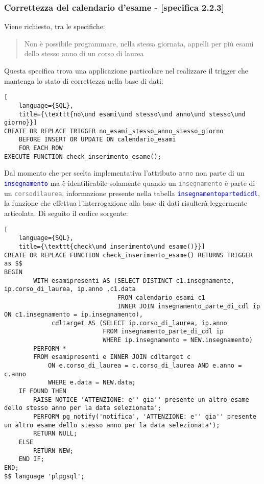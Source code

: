 \documentclass{article}
\newcommand{\tabb}[1]{\texttt{\textcolor{blue}{#1}}}
\newcommand{\attr}[1]{\texttt{\textcolor{gray}{#1}}}
\newcommand{\und}[0]{\textunderscore}
\begin{document}
\subsubsection{Correttezza del calendario d'esame - [specifica 2.2.3]}
Viene richiesto, tra le specifiche:
\begin{quote}
    Non è possibile programmare, nella stessa giornata, appelli per più esami dello stesso anno di un corso di laurea
\end{quote}
Questa specifica trova una applicazione particolare nel realizzare il trigger che mantenga lo stato di correttezza nella base di dati:
\begin{lstlisting}[
    language={SQL},
    title={\texttt{no\und esami\und stesso\und anno\und stesso\und giorno}}]
CREATE OR REPLACE TRIGGER no_esami_stesso_anno_stesso_giorno
    BEFORE INSERT OR UPDATE ON calendario_esami
    FOR EACH ROW
EXECUTE FUNCTION check_inserimento_esame();

\end{lstlisting}
Dal momento che per scelta implementativa l'attributo \attr{anno} non parte di un \tabb{insegnamento} ma è identificabile solamente quando un \attr{insegnamento} è parte di un \attr{corso\und di\und laurea}, informazione presente nella tabella \tabb{insegnamento\und parte\und di\und cdl}, la funzione che effettua l'interrogazione alla base di dati risulterà leggermente articolata. Di seguito il codice sorgente:
\begin{lstlisting}[
    language={SQL},
    title={\texttt{check\und inserimento\und esame()}}]
CREATE OR REPLACE FUNCTION check_inserimento_esame() RETURNS TRIGGER as $$
BEGIN
        WITH esamipresenti AS (SELECT DISTINCT c1.insegnamento, ip.corso_di_laurea, ip.anno ,c1.data
                               FROM calendario_esami c1
                               INNER JOIN insegnamento_parte_di_cdl ip ON c1.insegnamento = ip.insegnamento),
             cdltarget AS (SELECT ip.corso_di_laurea, ip.anno
                           FROM insegnamento_parte_di_cdl ip
                           WHERE ip.insegnamento = NEW.insegnamento)
        PERFORM *
        FROM esamipresenti e INNER JOIN cdltarget c
            ON e.corso_di_laurea = c.corso_di_laurea AND e.anno = c.anno
            WHERE e.data = NEW.data;
    IF FOUND THEN
        RAISE NOTICE 'ATTENZIONE: e'' gia'' presente un altro esame dello stesso anno per la data selezionata';
        PERFORM pg_notify('notifica', 'ATTENZIONE: e'' gia'' presente un altro esame dello stesso anno per la data selezionata');
        RETURN NULL;
    ELSE
        RETURN NEW;
    END IF;
END;
$$ language 'plpgsql';
\end{lstlisting}
\end{document}
